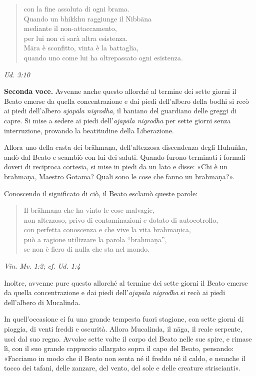 \begin{quotation}
con la fine assoluta di ogni brama. \\
Quando un bhikkhu raggiunge il Nibbāna \\
mediante il non-attaccamento, \\
per lui non ci sarà altra esistenza. \\
Māra è sconfitto, vinta è la battaglia, \\
quando uno come lui ha oltrepassato ogni esistenza.
\end{quotation}

\emph{Ud. 3:10}


\textbf{Seconda voce.} Avvenne anche questo allorché al termine dei sette giorni
il Beato emerse da quella concentrazione e dai piedi dell’albero della
bodhi si recò ai piedi dell’albero \emph{ajapāla nigrodha}, il baniano del
guardiano delle greggi di capre. Si mise a sedere ai piedi dell’\emph{ajapāla
nigrodha} per sette giorni senza interruzione, provando la beatitudine
della Liberazione.


Allora uno della casta dei brāhmaṇa, dell’altezzosa discendenza degli
Huhuṅka, andò dal Beato e scambiò con lui dei saluti. Quando furono
terminati i formali doveri di reciproca cortesia, si mise in piedi da un
lato e disse: «Chi è un brāhmaṇa, Maestro Gotama? Quali sono le cose che
fanno un brāhmaṇa?».


Conoscendo il significato di ciò, il Beato esclamò queste parole:


\begin{quotation}
Il brāhmaṇa che ha vinto le cose malvagie, \\
non altezzoso, privo di contaminazioni e dotato di autocotrollo, \\
con perfetta conoscenza e che vive la vita brāhmaṇica, \\
può a ragione utilizzare la parola “brāhmaṇa”, \\
se non è fiero di nulla che sta nel mondo.
\end{quotation}

\emph{Vin. Mv. 1:2; cf. Ud. 1:4}


Inoltre, avvenne pure questo allorché al termine dei sette giorni il
Beato emerse da quella concentrazione e dai piedi dell’\emph{ajapāla
nigrodha} si recò ai piedi dell’albero di Mucalinda.


In quell’occasione ci fu una grande tempesta fuori stagione, con sette
giorni di pioggia, di venti freddi e oscurità. Allora Mucalinda, il
nāga, il reale serpente, uscì dal suo regno. Avvolse sette volte il
corpo del Beato nelle sue spire, e rimase lì, con il suo grande
cappuccio allargato sopra il capo del Beato, pensando: «Facciamo in modo
che il Beato non senta né il freddo né il caldo, e neanche il tocco dei
tafani, delle zanzare, del vento, del sole e delle creature
striscianti».


